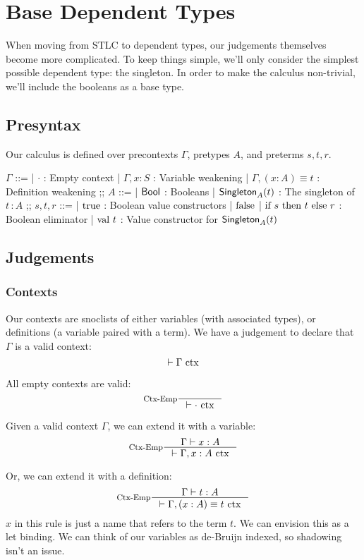 \section{Base Dependent Types}
When moving from STLC to dependent types, our judgements themselves become more complicated.
To keep things simple, we'll only consider the simplest possible dependent type: the singleton.
In order to make the calculus non-trivial, we'll include the booleans as a base type.

\subsection{Presyntax}
Our calculus is defined over precontexts $\Gamma$, pretypes $A$, and preterms $s, t, r$.

\begin{bnf}
$\Gamma$ ::=
  | $\cdot$ : Empty context
  | $\Gamma, x \colon S$ : Variable weakening
  | $\Gamma, (x : A) \equiv t$ : Definition weakening
;;
$A$ ::=
  | $\textsf{Bool}$ : Booleans
  | $\textsf{Singleton}_{A}(t)$ : The singleton of $t \,\colon A$
;;
$s, t, r$ ::=
| $\textrm{true}$ : Boolean value constructors
| $\textrm{false}$
| $\textrm{if } s \textrm{ then } t \textrm{ else } r$ : Boolean eliminator
| $\textrm{val } t$ : Value constructor for $\textsf{Singleton}_{A}(t)$
\end{bnf}


\subsection{Judgements}
\subsubsection{Contexts}
Our contexts are snoclists of either variables (with associated types), or definitions (a variable paired with a term).
We have a judgement to declare that $\Gamma$ is a valid context:
\[
  \vdash \Gamma \textrm{ ctx}
\]

All empty contexts are valid:
\[
  \inference[Ctx-Emp]{}{\vdash \ctx{\cdot}}
\]

Given a valid context $\Gamma$, we can extend it with a variable:
\[
  \inference[Ctx-Emp]
  {\Gamma \vdash x : A}
  {\vdash \ctx{\Gamma, x : A}}
\]

Or, we can extend it with a definition:
\[
  \inference[Ctx-Emp]
  {\Gamma \vdash t : A}
  {\vdash \ctx{\Gamma, (x : A) \equiv t}}
\]
$x$ in this rule is just a name that refers to the term $t$.
We can envision this as a let binding.
We can think of our variables as de-Bruijn indexed, so shadowing isn't an issue.

